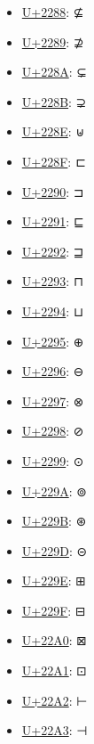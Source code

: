 \begin{itemize}
	\item \href{https://www.compart.com/en/unicode/U+2288}{U+2288}: ⊈
	\item \href{https://www.compart.com/en/unicode/U+2289}{U+2289}: ⊉
	\item \href{https://www.compart.com/en/unicode/U+228A}{U+228A}: ⊊
	\item \href{https://www.compart.com/en/unicode/U+228B}{U+228B}: ⊋
	\item \href{https://www.compart.com/en/unicode/U+228E}{U+228E}: ⊎
	\item \href{https://www.compart.com/en/unicode/U+228F}{U+228F}: ⊏
	\item \href{https://www.compart.com/en/unicode/U+2290}{U+2290}: ⊐
	\item \href{https://www.compart.com/en/unicode/U+2291}{U+2291}: ⊑
	\item \href{https://www.compart.com/en/unicode/U+2292}{U+2292}: ⊒
	\item \href{https://www.compart.com/en/unicode/U+2293}{U+2293}: ⊓
	\item \href{https://www.compart.com/en/unicode/U+2294}{U+2294}: ⊔
	\item \href{https://www.compart.com/en/unicode/U+2295}{U+2295}: ⊕
	\item \href{https://www.compart.com/en/unicode/U+2296}{U+2296}: ⊖
	\item \href{https://www.compart.com/en/unicode/U+2297}{U+2297}: ⊗
	\item \href{https://www.compart.com/en/unicode/U+2298}{U+2298}: ⊘
	\item \href{https://www.compart.com/en/unicode/U+2299}{U+2299}: ⊙
	\item \href{https://www.compart.com/en/unicode/U+229A}{U+229A}: ⊚
	\item \href{https://www.compart.com/en/unicode/U+229B}{U+229B}: ⊛
	\item \href{https://www.compart.com/en/unicode/U+229D}{U+229D}: ⊝
	\item \href{https://www.compart.com/en/unicode/U+229E}{U+229E}: ⊞
	\item \href{https://www.compart.com/en/unicode/U+229F}{U+229F}: ⊟
	\item \href{https://www.compart.com/en/unicode/U+22A0}{U+22A0}: ⊠
	\item \href{https://www.compart.com/en/unicode/U+22A1}{U+22A1}: ⊡
	\item \href{https://www.compart.com/en/unicode/U+22A2}{U+22A2}: ⊢
	\item \href{https://www.compart.com/en/unicode/U+22A3}{U+22A3}: ⊣

\end{itemize}
